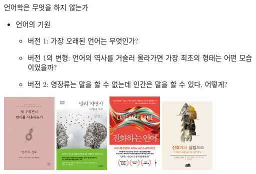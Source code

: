 \documentclass[11pt, aspectratio=169]{beamer}
\begin{document}
\begin{frame}[t]{}
  \begin{block}{언어학은 무엇을 하지 않는가}
    \begin{itemize}
      \item 언어의 기원
       \begin{itemize}
        \item 버전 1: 가장 오래된 언어는 무엇인가? 
        \item 버전 1의 변형: 언어의 역사를 거슬러 올라가면 가장 최초의 형태는 어떤 모습이었을까? 
        \item 버전 2: 영장류는 말을 할 수 없는데 인간은 말을 할 수 있다, 어떻게? 
       \end{itemize}
    \end{itemize}
    \begin{center}
      \includegraphics[width=0.2\textwidth]{img/8946065338_1.jpg} 
      \includegraphics[width=0.2\textwidth]{img/k962831307_1.jpg} 
      \includegraphics[width=0.2\textwidth]{img/k432832329_2.jpg} 
      \includegraphics[width=0.2\textwidth]{img/k172938313_1.jpg}
    \end{center}
  \end{block}
\end{frame}
\end{document}
